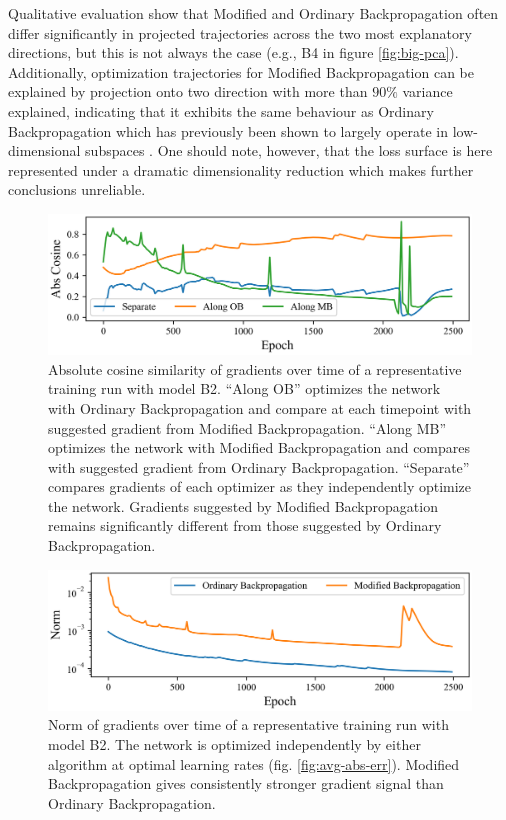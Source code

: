 \documentclass{article}
\theoremstyle{plain}
\theoremstyle{definition}
\theoremstyle{remark}
\begin{document}
Qualitative evaluation show that Modified and Ordinary Backpropagation often differ significantly in projected trajectories across the two most explanatory directions, but this is not always the case (e.g., B4 in figure \ref{fig:big-pca}). Additionally, optimization trajectories for Modified Backpropagation can be explained by projection onto two direction with more than $90\%$ variance explained, indicating that it exhibits the same behaviour as Ordinary Backpropagation which has previously been shown to largely operate in low-dimensional subspaces \cite{li-visualizing}. One should note, however, that the loss surface is here represented under a dramatic dimensionality reduction which makes further conclusions unreliable.

\begin{figure}[h]
    \centering
    \includegraphics[width=0.95\columnwidth]{./resources/cos.png}
    \caption{Absolute cosine similarity of gradients over time of a representative training run with model B2. ``Along OB'' optimizes the network with Ordinary Backpropagation and compare at each timepoint with suggested gradient from Modified Backpropagation. ``Along MB'' optimizes the network with Modified Backpropagation and compares with suggested gradient from Ordinary Backpropagation. ``Separate'' compares gradients of each optimizer as they independently optimize the network. Gradients suggested by Modified Backpropagation remains significantly different from those suggested by Ordinary Backpropagation.}
    \label{fig:cos-b2}
\end{figure}

\begin{figure}[h]
    \centering
    \includegraphics[width=0.95\columnwidth]{./resources/norm.png}
    \caption{Norm of gradients over time of a representative training run with model B2. The network is optimized independently by either algorithm at optimal learning rates (fig. \ref{fig:avg-abs-err}). Modified Backpropagation gives consistently stronger gradient signal than Ordinary Backpropagation.}
    \label{fig:norm-b2}
\end{figure}
\end{document}
